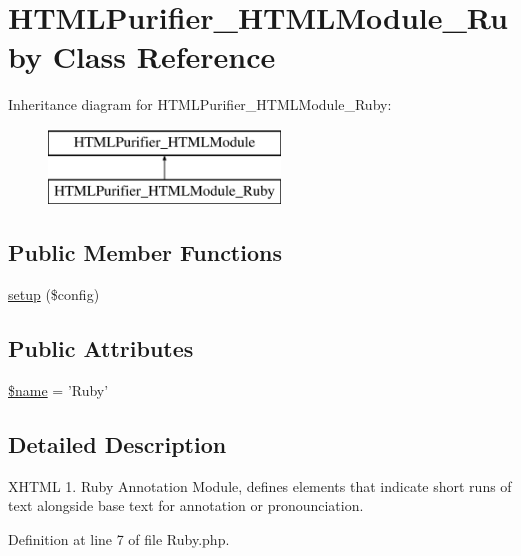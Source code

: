 \hypertarget{classHTMLPurifier__HTMLModule__Ruby}{\section{H\+T\+M\+L\+Purifier\+\_\+\+H\+T\+M\+L\+Module\+\_\+\+Ruby Class Reference}
\label{classHTMLPurifier__HTMLModule__Ruby}
}
Inheritance diagram for H\+T\+M\+L\+Purifier\+\_\+\+H\+T\+M\+L\+Module\+\_\+\+Ruby\+:\begin{figure}[H]
\begin{center}
\leavevmode
\includegraphics[height=2.000000cm]{classHTMLPurifier__HTMLModule__Ruby}
\end{center}
\end{figure}
\subsection*{Public Member Functions}
\begin{DoxyCompactItemize}
\item 
\hyperlink{classHTMLPurifier__HTMLModule__Ruby_a28836aa52bc6e304187620d549fd98c5}{setup} (\$config)
\end{DoxyCompactItemize}
\subsection*{Public Attributes}
\begin{DoxyCompactItemize}
\item 
\hyperlink{classHTMLPurifier__HTMLModule__Ruby_ab2064cc5bf30b8eb89dc8720e18b0bc6}{\$name} = 'Ruby'
\end{DoxyCompactItemize}


\subsection{Detailed Description}
X\+H\+T\+M\+L 1. Ruby Annotation Module, defines elements that indicate short runs of text alongside base text for annotation or pronounciation. 

Definition at line 7 of file Ruby.\+php.



